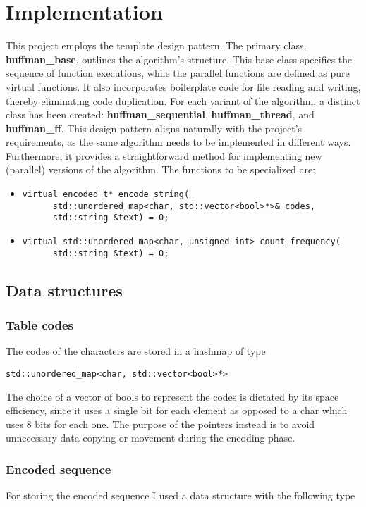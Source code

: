 \documentclass{article}
\begin{document}
\section{Implementation}
This project employs the template design pattern. The primary class, \textbf{huffman\_base}, outlines the algorithm's structure.
This base class specifies the sequence of function executions, while the parallel functions are defined as pure virtual functions.
It also incorporates boilerplate code for file reading and writing, thereby eliminating code duplication.
For each variant of the algorithm, a distinct class has been created: \textbf{huffman\_sequential}, \textbf{huffman\_thread}, and \textbf{huffman\_ff}.
This design pattern aligns naturally with the project's requirements, as the same algorithm needs to be implemented in different ways.
Furthermore, it provides a straightforward method for implementing new (parallel) versions of the algorithm.
The functions to be specialized are:
\begin{itemize}
    \item \begin{verbatim}
virtual encoded_t* encode_string(
      std::unordered_map<char, std::vector<bool>*>& codes,
      std::string &text) = 0;
\end{verbatim}
    \item \begin{verbatim}
virtual std::unordered_map<char, unsigned int> count_frequency(
      std::string &text) = 0;
    \end{verbatim}
\end{itemize}

\subsection{Data structures}
\subsubsection{Table codes}
The codes of the characters are stored in a hashmap of type
\begin{verbatim}
std::unordered_map<char, std::vector<bool>*>
\end{verbatim}
The choice of a vector of bools to represent the codes is dictated by its space efficiency, since it uses a single bit for each element
as opposed to a char which uses 8 bits for each one.
The purpose of the pointers instead is to avoid unnecessary data copying or movement during the encoding phase.
\subsubsection{Encoded sequence}
For storing the encoded sequence I used a data structure with the following type
\end{document}
